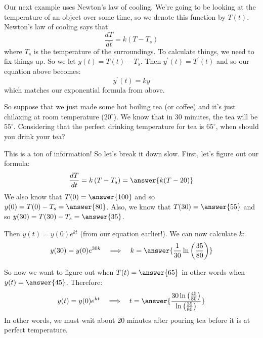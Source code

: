 \documentclass{ximera}
\begin{document}
\begin{example}\label{example:8-4}
Our next example uses Newton's law of cooling. We're going to be looking at the temperature of an object over some time, so we denote this function by $T(t)$. Newton's law of cooling says that
\[
\frac{d T}{d t}=k\left(T-T_{s}\right)
\]
where $T_{s}$ is the temperature of the surroundings. To calculate things, we need to fix things up. So we let $y(t)=T(t)-T_{s}$. Then $y^{\prime}(t)=T^{\prime}(t)$ and so our equation above becomes:
\[
y^{\prime}(t)=k y
\]
which matches our exponential formula from above.

So suppose that we just made some hot boiling tea (or coffee) and it's just chilaxing at room temperature ($20^{\circ}$). We know that in 30 minutes, the tea will be $55^{\circ}$. Considering that the perfect drinking temperature for tea is $65^{\circ}$, when should you drink your tea?

This is a ton of information! So let's break it down slow. First, let's figure out our formula:
\[
\frac{d T}{d t}=k\left(T-T_{s}\right)=\answer{k(T-20)}
\]
We also know that $T(0)=\answer{100}$ and so $y(0)=T(0)-T_{s}=\answer{80}$.
Also, we know that $T(30)=\answer{55}$ and so $y(30)=T(30)-T_{s}=\answer{35}$.

Then $y(t)=y(0) e^{k t}$ (from our equation earlier!). We can now calculate $k$:
\[
y(30)=y(0)e^{30k}
\quad\Longrightarrow\quad
k=\answer{\frac{1}{30}\ln\left(\frac{35}{80}\right)}
\]

So now we want to figure out when $T(t)=\answer{65}$ in other words when $y(t)=\answer{45}$. Therefore:
\[
y(t)=y(0)e^{kt}
\quad\Longrightarrow\quad
t=\answer{\frac{30\ln\left(\frac{45}{80}\right)}{\ln\left(\frac{35}{80}\right)}}
\]
In other words, we must wait about 20 minutes after pouring tea before it is at perfect temperature.
\end{example}
\end{document}
